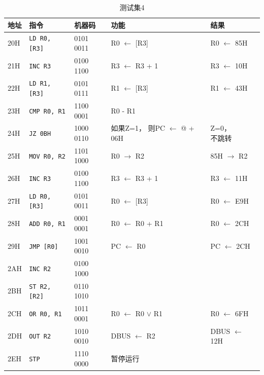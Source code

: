 \documentclass[lang=cn,11pt,a4paper,cite=authornum]{paper}
\begin{document}
\begin{table}[!htbp]
    \centering
    \caption{测试集4\label{tab:base_test_4}}
    \begin{tabular}{|l|l|l|l|l|}
        \hline 
        地址 & 指令 & 机器码  &  功能 & 结果 \\ \hline 
        20H & \texttt{LD R0, [R3]} & 0101 0011  &  R0 $\leftarrow$ [R3] & R0 $\leftarrow$ 85H \\ \hline 
        21H & \texttt{INC R3} & 0100 1100  &  R3 $\leftarrow$ R3 + 1 & R3 $\leftarrow$ 10H \\ \hline 
        22H & \texttt{LD R1, [R3]} & 0101 0111  &  R1 $\leftarrow$ [R3]  & R1 $\leftarrow$ 43H \\ \hline 
        23H & \texttt{CMP R0, R1} & 1100 0001  &  R0 - R1 & \\ \hline 
        24H & \texttt{JZ 0BH} & 1000 0110  &  \makecell[l]{如果Z=1，\\则PC $\leftarrow$ @ + 06H} & \makecell[l]{Z=0，\\不跳转} \\ \hline 
        25H & \texttt{MOV R0, R2} & 1101 1000  &  R0 $\rightarrow$ R2 & 85H $\rightarrow$ R2 \\ \hline 
        26H & \texttt{INC R3} & 0100 1100  &  R3 $\leftarrow$ R3 + 1 & R3 $\leftarrow$ 11H \\ \hline 
        27H & \texttt{LD R0, [R3]} & 0101 0011  &  R0 $\leftarrow$ [R3]  & R0 $\leftarrow$ E9H \\ \hline 
        28H & \texttt{ADD R0, R1} & 0001 0001  &  R0 $\leftarrow$ R0 + R1 & R0 $\leftarrow$ 2CH \\ \hline 
        29H & \texttt{JMP [R0]} & 1001 0010  &  PC $\leftarrow$ R0 & PC $\leftarrow$ 2CH \\ \hline 
        2AH & \texttt{INC R2} & 0100 1000  &   &  \\ \hline 
        2BH & \texttt{ST R2, [R2]} & 0110 1010  &   &  \\ \hline 
        2CH & \texttt{OR R0, R1} & 1011 0001  &  R0 $\leftarrow$ R0 $\vee$ R1 & R0 $\leftarrow$ 6FH \\ \hline 
        2DH & \texttt{OUT R2} & 1010 0010  &  DBUS $\leftarrow$ R2 & DBUS $\leftarrow$ 12H \\ \hline 
        2EH & \texttt{STP} & 1110 0000  &  暂停运行 &  \\ \hline

    \end{tabular}
\end{table}
\end{document}
